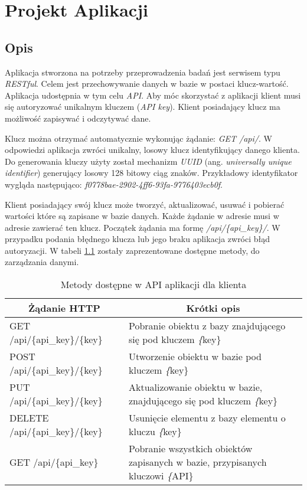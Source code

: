 \chapter{Projekt Aplikacji}
\section{Opis}
Aplikacja stworzona na potrzeby przeprowadzenia badań jest serwisem typu \textsl{RESTful}. Celem jest przechowywanie danych w bazie w postaci klucz-wartość.  Aplikacja udostępnia w tym celu \textsl{API}. Aby móc skorzystać z aplikacji klient musi się autoryzować unikalnym kluczem (\textsl{API key}). Klient posiadający klucz ma możliwość zapisywać i odczytywać dane. 

Klucz można otrzymać automatycznie wykonując żądanie: \textsl{GET /api/}. W odpowiedzi aplikacja zwróci unikalny, losowy klucz identyfikujący danego klienta. Do generowania kluczy użyty został mechanizm \textsl{UUID} (ang. \textsl{universally unique identifier}) generujący losowy 128 bitowy ciąg znaków. Przykładowy identyfikator wygląda następująco: \textsl{f0778bae-2902-4ff6-93fa-9776403ecb0f}.

Klient posiadający swój klucz może tworzyć, aktualizować, usuwać i pobierać wartości które są zapisane w bazie danych. Każde żądanie w adresie musi w adresie zawierać ten klucz. Początek żądania ma formę \textsl{/api/\{api\_key\}/}. W przypadku podania błędnego klucza lub jego braku aplikacja zwróci błąd autoryzacji. W tabeli \ref{tab:restcache-api} zostały zaprezentowane dostępne metody, do zarządzania danymi.
\begin{table}[!htb]
\centering
\caption{Metody dostępne w API aplikacji dla klienta}
\label{tab:restcache-api}
\begin{tabularx}{\textwidth}{@{} X X @{}}
\toprule
\multicolumn{1}{c}{\textbf{Żądanie HTTP}}            & \multicolumn{1}{c}{\textbf{Krótki opis}}                                               \\ \midrule
GET /api/\{api\_key\}/\{key\}                        & Pobranie obiektu z bazy znajdującego się pod kluczem \textsl\{key\}                   \\
POST /api/\{api\_key\}/\{key\}                       & Utworzenie obiektu w bazie pod kluczem \textsl\{key\}                                 \\
PUT /api/\{api\_key\}/\{key\}                        & Aktualizowanie obiektu w bazie, znajdującego się pod kluczem \textsl\{key\}        \\
DELETE /api/\{api\_key\}/\{key\} & Usunięcie elementu z bazy elementu o kluczu \textsl\{key\}                            \\
GET /api/\{api\_key\}                                & Pobranie wszystkich obiektów zapisanych w bazie, przypisanych kluczowi \textsl\{API\} \\
\end{tabularx}
\end{table}

